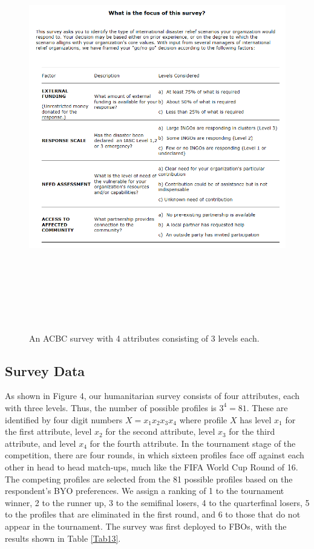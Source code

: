 \documentclass[a4paper, 12pt]{article}
\begin{document}
\begin{figure}[!htpb]
\centering
\includegraphics[width=5.75in, height=7in]{AttributeLevels.png}
\caption{{\small An ACBC survey with 4 attributes consisting of 3 levels each. }}
\label{AL}
\end{figure}


\subsection{Survey Data}

As shown in Figure 4, our humanitarian survey consists of four attributes, each with three levels. Thus, the number of possible profiles is $3^4=81$. These are identified by four digit numbers $X=x_1x_2x_3x_4$ where profile $X$ has level $x_1$ for the first attribute, level $x_2$ for the second attribute, level $x_3$ for the third attribute, and level $x_4$ for the fourth attribute. In the tournament stage of the competition, there are four rounds, in which sixteen profiles face off against each other in head to head match-ups, much like the FIFA World Cup Round of 16. The competing profiles are selected from the 81 possible profiles based on the respondent's BYO preferences. We assign a ranking of 1 to the tournament winner, 2 to the runner up, 3 to the semifinal losers, 4 to the quarterfinal losers, 5 to the profiles that are eliminated in the first round, and 6 to those that do not appear in the tournament. The survey was first deployed to FBOs, with the results shown in Table \ref{Tab13}. 
\end{document}
